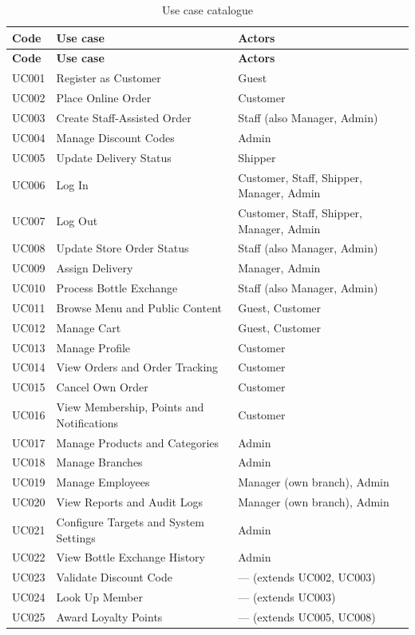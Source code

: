 \begin{longtable}{|L{1.5cm}|L{6.2cm}|L{6.4cm}|}
  \caption{Use case catalogue}\label{tab:uc-catalogue}\\
  \hline
  \textbf{Code} & \textbf{Use case} & \textbf{Actors} \\ \hline
  \endfirsthead
  \hline
  \textbf{Code} & \textbf{Use case} & \textbf{Actors} \\ \hline
  \endhead
  UC001 & Register as Customer & Guest \\ \hline
  UC002 & Place Online Order & Customer \\ \hline
  UC003 & Create Staff-Assisted Order & Staff (also Manager, Admin) \\ \hline
  UC004 & Manage Discount Codes & Admin \\ \hline
  UC005 & Update Delivery Status & Shipper \\ \hline
  UC006 & Log In & Customer, Staff, Shipper, Manager, Admin \\ \hline
  UC007 & Log Out & Customer, Staff, Shipper, Manager, Admin \\ \hline
  UC008 & Update Store Order Status & Staff (also Manager, Admin) \\ \hline
  UC009 & Assign Delivery & Manager, Admin \\ \hline
  UC010 & Process Bottle Exchange & Staff (also Manager, Admin) \\ \hline
  UC011 & Browse Menu and Public Content & Guest, Customer \\ \hline
  UC012 & Manage Cart & Guest, Customer \\ \hline
  UC013 & Manage Profile & Customer \\ \hline
  UC014 & View Orders and Order Tracking & Customer \\ \hline
  UC015 & Cancel Own Order & Customer \\ \hline
  UC016 & View Membership, Points and Notifications & Customer \\ \hline
  UC017 & Manage Products and Categories & Admin \\ \hline
  UC018 & Manage Branches & Admin \\ \hline
  UC019 & Manage Employees & Manager (own branch), Admin \\ \hline
  UC020 & View Reports and Audit Logs & Manager (own branch), Admin \\ \hline
  UC021 & Configure Targets and System Settings & Admin \\ \hline
  UC022 & View Bottle Exchange History & Admin \\ \hline
  UC023 & Validate Discount Code & --- (extends UC002, UC003) \\ \hline
  UC024 & Look Up Member & --- (extends UC003) \\ \hline
  UC025 & Award Loyalty Points & --- (extends UC005, UC008) \\ \hline
\end{longtable}

